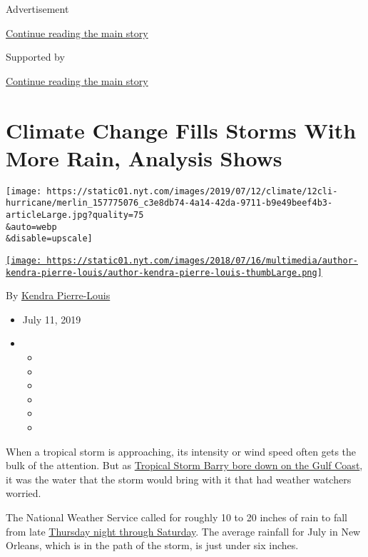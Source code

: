 Advertisement

\protect\hyperlink{after-top}{Continue reading the main story}

Supported by

\protect\hyperlink{after-sponsor}{Continue reading the main story}

\hypertarget{climate-change-fills-storms-with-more-rain-analysis-shows}{%
\section{Climate Change Fills Storms With More Rain, Analysis
Shows}\label{climate-change-fills-storms-with-more-rain-analysis-shows}}

\texttt{[image: https://static01.nyt.com/images/2019/07/12/climate/12cli-hurricane/merlin\_157775076\_c3e8db74-4a14-42da-9711-b9e49beef4b3-articleLarge.jpg?quality=75\\\&auto=webp\\\&disable=upscale]}

\href{https://www.nytimes.com/by/kendra-pierre-louis}{\texttt{[image: https://static01.nyt.com/images/2018/07/16/multimedia/author-kendra-pierre-louis/author-kendra-pierre-louis-thumbLarge.png]}}

By \href{https://www.nytimes.com/by/kendra-pierre-louis}{Kendra
Pierre-Louis}

\begin{itemize}
\item
  July 11, 2019
\item
  \begin{itemize}
  \item
  \item
  \item
  \item
  \item
  \item
  \end{itemize}
\end{itemize}

When a tropical storm is approaching, its intensity or wind speed often
gets the bulk of the attention. But as
\href{https://www.nytimes.com/2019/07/11/us/hurricane-barry-tropical-storm-questions.html}{Tropical
Storm Barry bore down on the Gulf Coast}, it was the water that the
storm would bring with it that had weather watchers worried.

The National Weather Service called for roughly 10 to 20 inches of rain
to fall from late
\href{https://www.nytimes.com/2019/07/11/us/hurricane-barry-tropical-storm-questions.html}{Thursday
night through Saturday}. The average rainfall for July in New Orleans,
which is in the path of the storm, is just under six inches.

